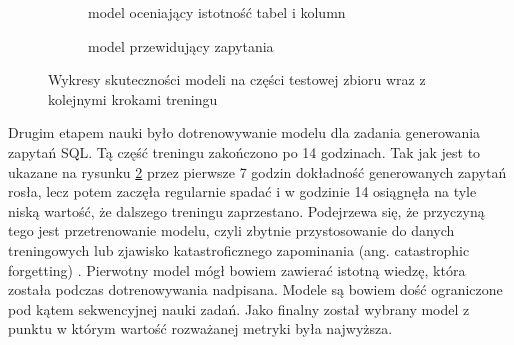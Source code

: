 \begin{figure}[ht!]
\centering
\begin{subfigure}{0.49\textwidth}
    \caption{model oceniający istotność tabel i kolumn}
    \label{plot:resdsql-classifier-accuracy}
\end{subfigure}
\hfill
\begin{subfigure}{0.49\textwidth}
    \caption{model przewidujący zapytania}
    \label{plot:resdsql-t5-accuracy}
\end{subfigure}
\caption{Wykresy skuteczności modeli  na części testowej zbioru  wraz z kolejnymi krokami treningu}
\label{plot:resdsql-accuracy}
\end{figure}

Drugim etapem nauki było dotrenowywanie modelu  dla zadania generowania zapytań SQL. Tą część treningu zakończono po 14 godzinach. Tak jak jest to ukazane na rysunku \ref{plot:resdsql-t5-accuracy} przez pierwsze 7 godzin dokładność generowanych zapytań rosła, lecz potem zaczęła regularnie spadać i w godzinie 14 osiągnęła na tyle niską wartość, że dalszego treningu zaprzestano. Podejrzewa się, że przyczyną tego jest przetrenowanie modelu, czyli zbytnie przystosowanie do danych treningowych lub zjawisko katastroficznego zapominania (ang. catastrophic forgetting) . Pierwotny model  mógł bowiem zawierać istotną wiedzę, która została podczas dotrenowywania nadpisana. Modele są bowiem dość ograniczone pod kątem sekwencyjnej nauki zadań. Jako finalny został wybrany model z punktu w którym wartość rozważanej metryki była najwyższa.

